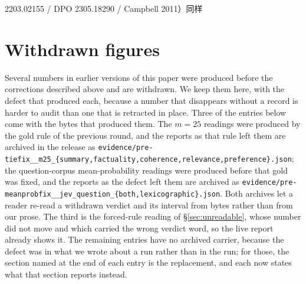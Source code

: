 \documentclass{article}
\newcommand{\ids}[1]{\texttt{\small #1}} %
\begin{document}
2203.02155 / DPO 2305.18290 / Campbell 2011）同样 %

\appendix
\section{Withdrawn figures}
\label{app:withdrawn}

Several numbers in earlier versions of this paper were produced before the
corrections described above and are withdrawn. We keep them here, with the
defect that produced each, because a number that disappears without a record is
harder to audit than one that is retracted in place. Three of the entries below come with the bytes that produced them. The $m=25$ readings were
produced by the gold rule of the previous round, and the reports as that rule left them are archived in the
release as \ids{evidence/pre-tiefix\_\_m25\_\{summary,factuality,coherence,relevance,preference\}.json}; the
question-corpus mean-probability readings were produced before that gold was fixed, and the reports as the
defect left them are archived as \ids{evidence/\allowbreak pre-meanprobfix\_\allowbreak\_\allowbreak jev\_\allowbreak question\_\allowbreak \{both,\allowbreak lexicographic\}.json}.
Both archives let a reader re-read a withdrawn verdict and its interval from bytes rather than from our prose.
The third is the forced-rule reading of \S\ref{sec:unreadable}, whose number did not move and which carried
the wrong verdict word, so the live report already shows it. The remaining entries have no archived carrier,
because the defect was in what we wrote about a run rather than in the run; for those, the section named at
the end of each entry is the replacement, and each now states what that section reports instead.
\end{document}
